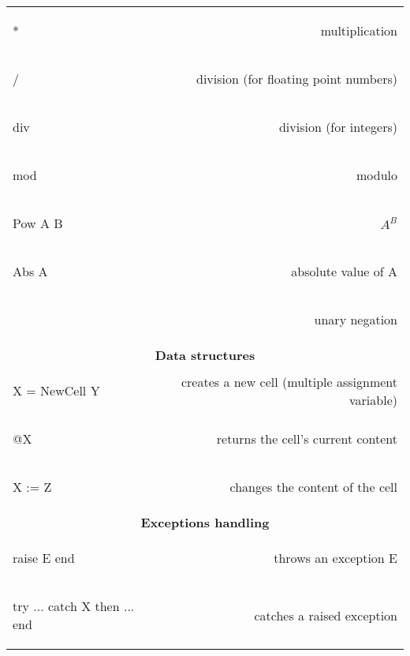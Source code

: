 \documentclass[12pt]{article}
\begin{document}
\begin{longtable}{l r}
\begin{oz}
*
\end{oz}
&multiplication\\
 
\begin{oz}
/
\end{oz}
&division (for floating point numbers)\\
 
\begin{oz}
div
\end{oz}
&division (for integers)\\
 
\begin{oz}
mod
\end{oz}
&modulo\\
 
\begin{oz}
{Pow A B}
\end{oz}
&$A^{B}$\\
 
\begin{oz}
{Abs A}
\end{oz}
&absolute value of A\\

\begin{oz}
~
\end{oz}
&unary negation\\[0.4em]
 


\multicolumn{2}{c}{\textbf{Data structures}}\\

\begin{oz}
X = {NewCell Y}
\end{oz}
&creates a new cell (multiple assignment variable) \\

\begin{oz}
@X
\end{oz}
& returns the cell's current content\\

\begin{oz}
X := Z
\end{oz}
&changes the content of the cell \\[0.4em]


\multicolumn{2}{c}{\textbf{Exceptions handling}}\\

\begin{oz}
raise E end
\end{oz}
&throws an exception E \\

\begin{oz}
try ... catch X then ... end
\end{oz}
&catches a raised exception\\

\bottomrule
\end{longtable}
\end{document}
